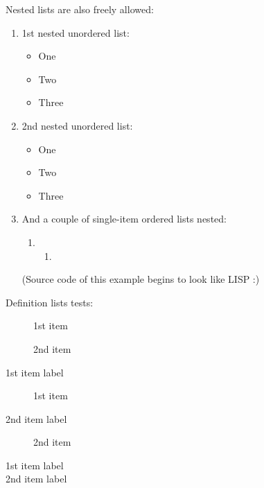 \documentclass{report}
\begin{document}
Nested lists are also freely allowed: \begin{enumerate}
\setcounter{enumi}{0} \setcounter{enumii}{0} \setcounter{enumiii}{0} \setcounter{enumiv}{0} 
\item  1st nested unordered list: \begin{itemize}
\item One
\item Two
\item Three
\end{itemize} 
\setcounter{enumi}{1} \setcounter{enumii}{1} \setcounter{enumiii}{1} \setcounter{enumiv}{1} 
\item  2nd nested unordered list: \begin{itemize}
\item One
\item Two
\item Three
\end{itemize} 
\setcounter{enumi}{2} \setcounter{enumii}{2} \setcounter{enumiii}{2} \setcounter{enumiv}{2} 
\item  And a couple of single{-}item ordered lists nested: \begin{enumerate}
\setcounter{enumi}{0} \setcounter{enumii}{0} \setcounter{enumiii}{0} \setcounter{enumiv}{0} 
\item  \begin{enumerate}
\setcounter{enumi}{0} \setcounter{enumii}{0} \setcounter{enumiii}{0} \setcounter{enumiv}{0} 
\item  
\end{enumerate}
\end{enumerate}

(Source code of this example begins to look like LISP :) 
\end{enumerate}

Definition lists tests:

\begin{description}
\item[] 1st item
\item[] 2nd item
\end{description}

\begin{description}
\item[1st item label] 1st item
\item[2nd item label] 2nd item
\end{description}

\begin{description}
\item[1st item label] 
\item[2nd item label] 
\end{description}
\end{document}
